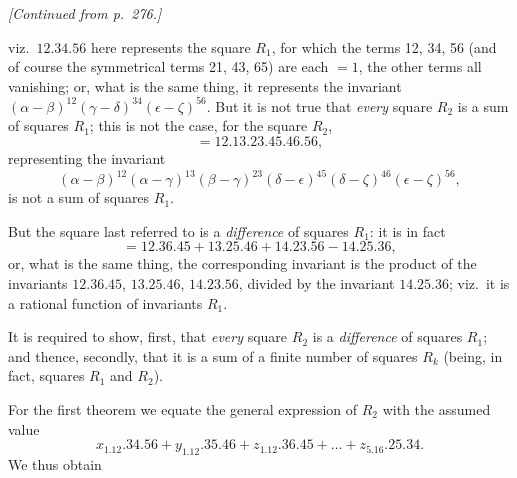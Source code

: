 \documentclass[11pt,a4paper]{book}
\begin{document}
\vspace{0.5\baselineskip}

\noindent\textit{[Continued from p.\ 276.]}

\vspace{\baselineskip}

viz.\ $12.34.56$ here represents the square $R_1$, for which the terms 12, 34, 56 (and of course the symmetrical terms 21, 43, 65) are each $=1$, the other terms all vanishing; or, what is the same thing, it represents the invariant $(\alpha-\beta)^{12}(\gamma-\delta)^{34}(\epsilon-\zeta)^{56}$. But it is not true that \textit{every} square $R_2$ is a sum of squares $R_1$; this is not the case, for the square $R_2$,
\[
=12.13.23.45.46.56,
\]
representing the invariant
\[
(\alpha-\beta)^{12}(\alpha-\gamma)^{13}(\beta-\gamma)^{23}(\delta-\epsilon)^{45}(\delta-\zeta)^{46}(\epsilon-\zeta)^{56},
\]
is not a sum of squares $R_1$.

But the square last referred to is a \textit{difference} of squares $R_1$: it is in fact
\[
=12.36.45 + 13.25.46 + 14.23.56 - 14.25.36,
\]
or, what is the same thing, the corresponding invariant is the product of the invariants $12.36.45$, $13.25.46$, $14.23.56$, divided by the invariant $14.25.36$; viz.\ it is a rational function of invariants $R_1$.

It is required to show, first, that \textit{every} square $R_2$ is a \textit{difference} of squares $R_1$; and thence, secondly, that it is a sum of a finite number of squares $R_k$ (being, in fact, squares $R_1$ and $R_2$).

For the first theorem we equate the general expression of $R_2$ with the assumed value
\[
x_1.12.34.56 + y_1.12.35.46 + z_1.12.36.45 + \ldots + z_5.16.25.34.
\]
We thus obtain
\end{document}
